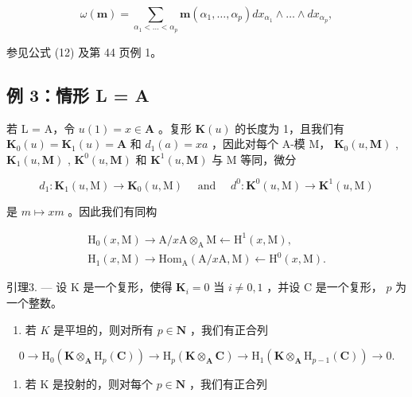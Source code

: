 \[
\omega (\boldsymbol {m}) = \sum_ {\alpha_ {1} <   \dots <   \alpha_ {p}} \boldsymbol {m} \left(\alpha_ {1}, \dots , \alpha_ {p}\right) d x _ {\alpha_ {1}} \wedge \dots \wedge d x _ {\alpha_ {p}},
\]

参见公式 (12) 及第 44 页例 1。

\subsection{例 3：情形 L = A}

若 L = A，令 \(u(1) = x \in \mathbf{A}\) 。复形 \(\mathbf{K}(u)\) 的长度为 1，且我们有 \(\mathbf{K}_{0}(u) = \mathbf{K}_{1}(u) = \mathbf{A}\) 和 \(d_{1}(a) = xa\) ，因此对每个 A-模 M， \(\mathbf{K}_{0}(u, \mathbf{M})\) , \(\mathbf{K}_{1}(u, \mathbf{M})\) , \(\mathbf{K}^{0}(u, \mathbf{M})\) 和 \(\mathbf{K}^{1}(u, \mathbf{M})\) 与 M 等同，微分

\[
d _ {1}: \mathbf {K} _ {1} (u, \mathrm{M}) \rightarrow \mathbf {K} _ {0} (u, \mathrm{M}) \quad \text { and }\quad d ^ {0}: \mathbf {K} ^ {0} (u, \mathrm{M}) \rightarrow \mathbf {K} ^ {1} (u, \mathrm{M})
\]

是 \(m \mapsto xm\) 。因此我们有同构

\[
\begin{array}{l} \mathrm{H} _ {0} (x, \mathrm{M}) \to \mathrm{A} / x \mathrm{A} \otimes_ {\mathrm{A}} \mathrm{M} \leftarrow \mathrm{H} ^ {1} (x, \mathrm{M}), \\ \mathrm{H} _ {1} (x, \mathrm{M}) \to \mathrm{Hom} _ {\mathrm{A}} (\mathrm{A} / x \mathrm{A}, \mathrm{M}) \leftarrow \mathrm{H} ^ {0} (x, \mathrm{M}). \end{array}
\]

引理3. --- 设 K 是一个复形，使得 \(\mathbf{K}_i = 0\) 当 \(i \neq 0, 1\) ，并设 C 是一个复形， \(p\) 为一个整数。

\begin{enumerate}
\def\labelenumi{\alph{enumi})}
\tightlist
\item
  若 \(K\) 是平坦的，则对所有 \(p \in \mathbf{N}\) ，我们有正合列
\end{enumerate}

\[
0 \rightarrow \mathrm{H} _ {0} (\mathbf {K} \otimes_ {\mathbf {A}} \mathrm{H} _ {p} (\mathbf {C})) \rightarrow \mathrm{H} _ {p} (\mathbf {K} \otimes_ {\mathbf {A}} \mathbf {C}) \rightarrow \mathrm{H} _ {1} (\mathbf {K} \otimes_ {\mathbf {A}} \mathrm{H} _ {p - 1} (\mathbf {C})) \rightarrow 0.
\]

\begin{enumerate}
\def\labelenumi{\alph{enumi})}
\setcounter{enumi}{1}
\tightlist
\item
  若 K 是投射的，则对每个 \(p \in \mathbf{N}\) ，我们有正合列
\end{enumerate}

